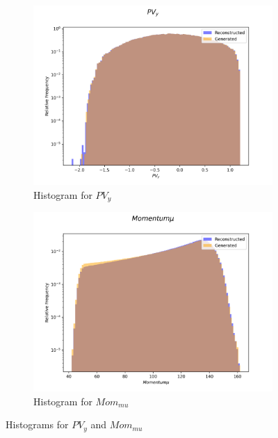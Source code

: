 \documentclass{article}
\begin{document}
\begin{figure}[H]
    \centering
    \begin{subfigure}[b]{0.45\textwidth}
        \includegraphics[width=\textwidth]{graphs/incl_PV_y.png}
        \caption{Histogram for $PV_y$}
        \label{fig:incl_PV_y}
    \end{subfigure}
    \hfill
    \begin{subfigure}[b]{0.45\textwidth}
        \includegraphics[width=\textwidth]{graphs/incl_Momentum_mu.png}
        \caption{Histogram for $Mom_{mu}$}
        \label{fig:incl_Momentum_mu}
    \end{subfigure}
    \caption{Histograms for $PV_y$ and $Mom_{mu}$}
\end{figure}
\end{document}
